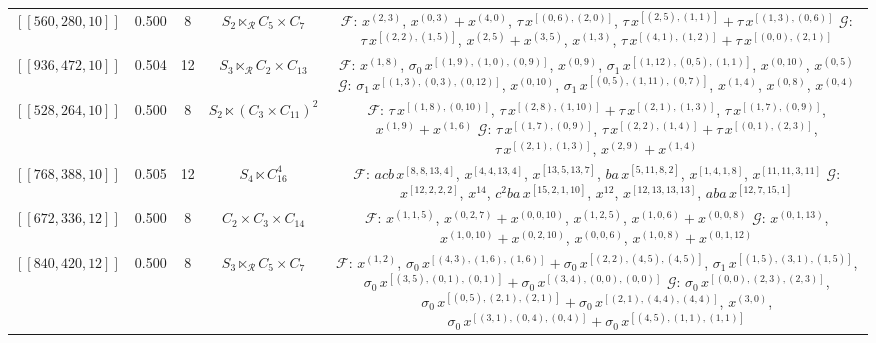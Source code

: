\begin{table}[t]
\begin{tabular}{lcccc}
$[[560, 280, 10]]$ & 0.500 & 8 & $S_{2} \ltimes_{\mathcal{R}} C_{5}\!\times\!C_{7}$ & \parbox[t]{0.46\textwidth}{\raggedright $\mathcal{F}$: $x^{(2,3)}$, $x^{(0,3)}{+}x^{(4,0)}$, $\tau\,x^{[(0,6),(2,0)]}$, $\tau\,x^{[(2,5),(1,1)]}{+}\tau\,x^{[(1,3),(0,6)]}$ \\ $\mathcal{G}$: $\tau\,x^{[(2,2),(1,5)]}$, $x^{(2,5)}{+}x^{(3,5)}$, $x^{(1,3)}$, $\tau\,x^{[(4,1),(1,2)]}{+}\tau\,x^{[(0,0),(2,1)]}$} \\
$[[936, 472, 10]]$ & 0.504 & 12 & $S_{3} \ltimes_{\mathcal{R}} C_{2}\!\times\!C_{13}$ & \parbox[t]{0.46\textwidth}{\raggedright $\mathcal{F}$: $x^{(1,8)}$, $\sigma_0\,x^{[(1,9),(1,0),(0,9)]}$, $x^{(0,9)}$, $\sigma_1\,x^{[(1,12),(0,5),(1,1)]}$, $x^{(0,10)}$, $x^{(0,5)}$ \\ $\mathcal{G}$: $\sigma_1\,x^{[(1,3),(0,3),(0,12)]}$, $x^{(0,10)}$, $\sigma_1\,x^{[(0,5),(1,11),(0,7)]}$, $x^{(1,4)}$, $x^{(0,8)}$, $x^{(0,4)}$} \\
$[[528, 264, 10]]$ & 0.500 & 8 & $S_{2} \ltimes (C_{3}\!\times\!C_{11})^{2}$ & \parbox[t]{0.46\textwidth}{\raggedright $\mathcal{F}$: $\tau\,x^{[(1,8),(0,10)]}$, $\tau\,x^{[(2,8),(1,10)]}{+}\tau\,x^{[(2,1),(1,3)]}$, $\tau\,x^{[(1,7),(0,9)]}$, $x^{(1,9)}{+}x^{(1,6)}$ \\ $\mathcal{G}$: $\tau\,x^{[(1,7),(0,9)]}$, $\tau\,x^{[(2,2),(1,4)]}{+}\tau\,x^{[(0,1),(2,3)]}$, $\tau\,x^{[(2,1),(1,3)]}$, $x^{(2,9)}{+}x^{(1,4)}$} \\
$[[768, 388, 10]]$ & 0.505 & 12 & $S_{4} \ltimes C_{16}^{4}$ & \parbox[t]{0.46\textwidth}{\raggedright $\mathcal{F}$: $acb\,x^{[8,8,13,4]}$, $x^{[4,4,13,4]}$, $x^{[13,5,13,7]}$, $ba\,x^{[5,11,8,2]}$, $x^{[1,4,1,8]}$, $x^{[11,11,3,11]}$ \\ $\mathcal{G}$: $x^{[12,2,2,2]}$, $x^{14}$, $c^{2}ba\,x^{[15,2,1,10]}$, $x^{12}$, $x^{[12,13,13,13]}$, $aba\,x^{[12,7,15,1]}$} \\
$[[672, 336, 12]]$ & 0.500 & 8 & $C_{2 }\!\times\!C_{ 3 }\!\times\!C_{ 14}$ & \parbox[t]{0.46\textwidth}{\raggedright $\mathcal{F}$: $x^{(1,1,5)}$, $x^{(0,2,7)}{+}x^{(0,0,10)}$, $x^{(1,2,5)}$, $x^{(1,0,6)}{+}x^{(0,0,8)}$ \\ $\mathcal{G}$: $x^{(0,1,13)}$, $x^{(1,0,10)}{+}x^{(0,2,10)}$, $x^{(0,0,6)}$, $x^{(1,0,8)}{+}x^{(0,1,12)}$} \\
$[[840, 420, 12]]$ & 0.500 & 8 & $S_{3} \ltimes_{\mathcal{R}} C_{5}\!\times\!C_{7}$ & \parbox[t]{0.46\textwidth}{\raggedright $\mathcal{F}$: $x^{(1,2)}$, $\sigma_0\,x^{[(4,3),(1,6),(1,6)]}{+}\sigma_0\,x^{[(2,2),(4,5),(4,5)]}$, $\sigma_1\,x^{[(1,5),(3,1),(1,5)]}$, $\sigma_0\,x^{[(3,5),(0,1),(0,1)]}{+}\sigma_0\,x^{[(3,4),(0,0),(0,0)]}$ \\ $\mathcal{G}$: $\sigma_0\,x^{[(0,0),(2,3),(2,3)]}$, $\sigma_0\,x^{[(0,5),(2,1),(2,1)]}{+}\sigma_0\,x^{[(2,1),(4,4),(4,4)]}$, $x^{(3,0)}$, $\sigma_0\,x^{[(3,1),(0,4),(0,4)]}{+}\sigma_0\,x^{[(4,5),(1,1),(1,1)]}$} \\

\end{tabular}
\end{table}
